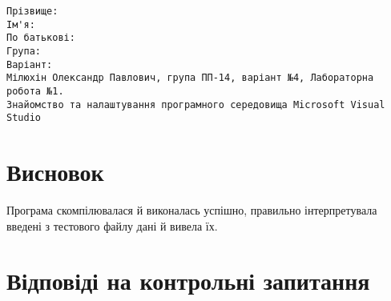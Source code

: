 \documentclass[a4paper, 12pt, oneside]{extarticle}
\begin{document}
\begin{verbatim}
Прізвище:
Ім'я:
По батькові:
Група:
Варіант:
Мілюхін Олександр Павлович, група ПП-14, варіант №4, Лабораторна робота №1.
Знайомство та налаштування програмного середовища Microsoft Visual Studio
\end{verbatim}

\section*{Висновок}
Програма скомпілювалася й виконалась успішно, правильно
інтерпретувала введені з тестового файлу дані й вивела їх.

\section*{Відповіді на контрольні запитання}
\end{document}
